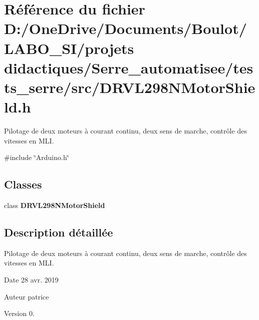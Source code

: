 \section{Référence du fichier D\+:/\+One\+Drive/\+Documents/\+Boulot/\+L\+A\+B\+O\+\_\+\+S\+I/projets didactiques/\+Serre\+\_\+automatisee/tests\+\_\+serre/src/\+D\+R\+V\+L298\+N\+Motor\+Shield.h}
\label{_d_r_v_l298_n_motor_shield_8h}


Pilotage de deux moteurs à courant continu, deux sens de marche, contrôle des vitesses en M\+LI.  


{\ttfamily \#include \char`\"{}Arduino.\+h\char`\"{}}\newline
\subsection*{Classes}
\begin{DoxyCompactItemize}
\item 
class \textbf{ D\+R\+V\+L298\+N\+Motor\+Shield}
\end{DoxyCompactItemize}


\subsection{Description détaillée}
Pilotage de deux moteurs à courant continu, deux sens de marche, contrôle des vitesses en M\+LI. 

\begin{DoxyDate}{Date}
28 avr. 2019 
\end{DoxyDate}
\begin{DoxyAuthor}{Auteur}
patrice 
\end{DoxyAuthor}
\begin{DoxyVersion}{Version}
0. 
\end{DoxyVersion}
